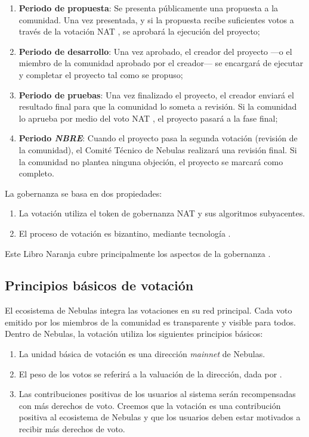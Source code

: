 \begin{enumerate}
	\item \textbf{Periodo de propuesta}: Se presenta públicamente una propuesta a la comunidad. Una vez presentada, y si la propuesta recibe suficientes votos a través de la votación NAT \onchain, se aprobará la ejecución del proyecto;
	\item \textbf{Periodo de desarrollo}: Una vez aprobado, el creador del proyecto —o el miembro de la comunidad aprobado por el creador— se encargará de ejecutar y completar el proyecto tal como se propuso;
	\item \textbf{Periodo de pruebas}: Una vez finalizado el proyecto, el creador enviará el resultado final para que la comunidad lo someta a revisión. Si la comunidad lo aprueba por medio del voto NAT \onchain, el proyecto pasará a la fase final;
	\item \textbf{Periodo \textit{NBRE}}: Cuando el proyecto pasa la segunda votación (revisión de la comunidad), el Comité Técnico de Nebulas realizará una revisión final. Si la comunidad no plantea ninguna objeción, el proyecto se marcará como completo.
\end{enumerate}

La gobernanza \onchain se basa en dos propiedades:

\begin{enumerate}
	\item La votación utiliza el token de gobernanza NAT y sus algoritmos subyacentes.
	\item El proceso de votación es bizantino, mediante tecnología \blockchain.
\end{enumerate}

Este Libro Naranja cubre principalmente los aspectos de la gobernanza \onchain.

\subsection{Principios básicos de votación}

El ecosistema de Nebulas integra las votaciones en su red principal. Cada voto emitido por los miembros de la comunidad es transparente y visible para todos. Dentro de Nebulas, la votación utiliza los siguientes principios básicos:

\begin{enumerate}
	\item La unidad básica de votación es una dirección \textit{mainnet} de Nebulas.
	\item El peso de los votos se referirá a la valuación de la dirección, dada por \nr.
	\item Las contribuciones positivas de los usuarios al sistema serán recompensadas con más derechos de voto. Creemos que la votación es una contribución positiva al ecosistema de Nebulas y que los usuarios deben estar motivados a recibir más derechos de voto.
\end{enumerate}

